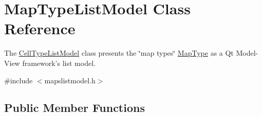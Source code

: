 \hypertarget{class_map_type_list_model}{\section{\-Map\-Type\-List\-Model \-Class \-Reference}
\label{class_map_type_list_model}
}


\-The \hyperlink{class_cell_type_list_model}{\-Cell\-Type\-List\-Model} class presents the \char`\"{}map types\char`\"{} \hyperlink{class_map_type}{\-Map\-Type} as a \-Qt \-Model-\/\-View framework's list model.  




{\ttfamily \#include $<$mapslistmodel.\-h$>$}

\subsection*{\-Public \-Member \-Functions}

